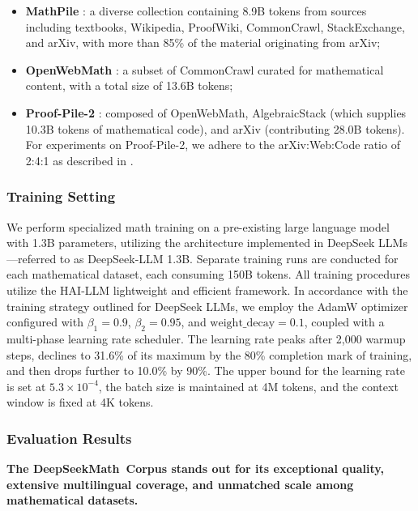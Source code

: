 \begin{itemize}[topsep=0pt]
\begin{itemize}[topsep=0pt]
    \item \textbf{MathPile} \citep{mathpile}: a diverse collection containing 8.9B tokens from sources including textbooks, Wikipedia, ProofWiki, CommonCrawl, StackExchange, and arXiv, with more than 85\% of the material originating from arXiv;
    \item \textbf{OpenWebMath} \citep{openwebmath}: a subset of CommonCrawl curated for mathematical content, with a total size of 13.6B tokens;
    \item \textbf{Proof-Pile-2} \citep{llemma}: composed of OpenWebMath, AlgebraicStack (which supplies 10.3B tokens of mathematical code), and arXiv (contributing 28.0B tokens). For experiments on Proof-Pile-2, we adhere to the arXiv:Web:Code ratio of 2:4:1 as described in \cite{llemma}.
\end{itemize}

\subsubsection{Training Setting}
\label{sec:quality-policy}
We perform specialized math training on a pre-existing large language model with 1.3B parameters, utilizing the architecture implemented in DeepSeek LLMs \citep{deepseek-llm}—referred to as DeepSeek-LLM 1.3B. Separate training runs are conducted for each mathematical dataset, each consuming 150B tokens. All training procedures utilize the HAI-LLM \citep{haillm} lightweight and efficient framework. In accordance with the training strategy outlined for DeepSeek LLMs, we employ the AdamW optimizer \citep{adamW} configured with $\beta_1=0.9$, $\beta_2=0.95$, and $\mathrm{weight\_decay}=0.1$, coupled with a multi-phase learning rate scheduler. The learning rate peaks after 2,000 warmup steps, declines to 31.6\% of its maximum by the 80\% completion mark of training, and then drops further to 10.0\% by 90\%. The upper bound for the learning rate is set at $5.3 \times 10^{-4}$, the batch size is maintained at 4M tokens, and the context window is fixed at 4K tokens.

\subsubsection{Evaluation Results}

\textbf{The DeepSeekMath~Corpus stands out for its exceptional quality, extensive multilingual coverage, and unmatched scale among mathematical datasets.}


\end{itemize}
